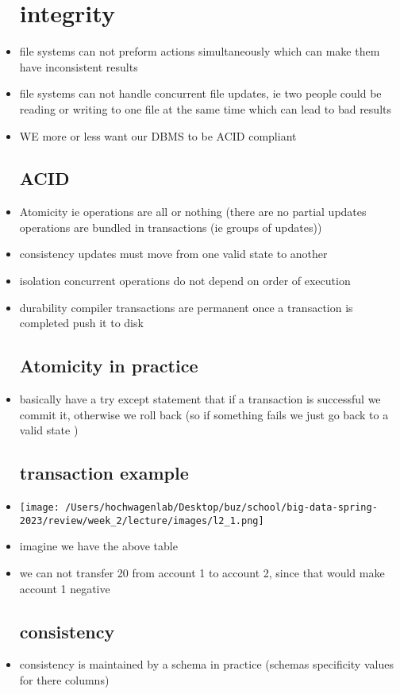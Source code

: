 \documentclass{article}
\begin{document}
\begin{itemize}
\section*{integrity }
\item file systems can not preform actions simultaneously which can make them have inconsistent results
\item file systems can not handle concurrent file updates, ie two people could be reading or writing to one file at the same time which can lead to bad results 
\item WE more or less want our DBMS to be ACID compliant 
\subsection*{ACID}
\item Atomicity ie operations are all or nothing (there are no partial updates operations are bundled in transactions (ie groups of updates)) 
\item consistency updates must move from one valid state to another 
\item isolation concurrent operations do not depend on order of execution 
\item durability compiler transactions are permanent once a transaction is completed push it to disk 
\subsection*{Atomicity in practice}
\item basically have a try except statement that if a transaction is successful we commit it, otherwise we roll back (so if something fails we just go back to a valid state )
\subsection*{transaction example}
\item \texttt{[image: /Users/hochwagenlab/Desktop/buz/school/big-data-spring-2023/review/week\_2/lecture/images/l2\_1.png]}
\item imagine we have the above table 
\item we can not transfer 20 from account 1 to account 2, since that would make account 1 negative 
\subsection*{consistency}
\item consistency is maintained by a schema in practice (schemas specificity values for there columns)

\end{itemize}
\end{document}

